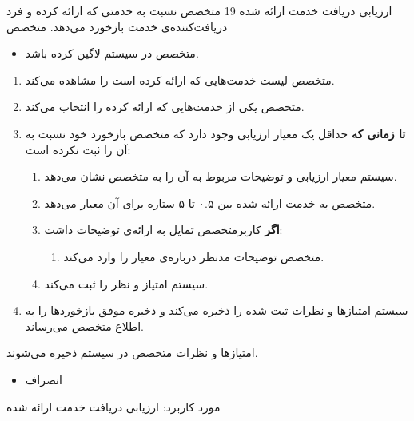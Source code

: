 \usecase
{
	ارزیابی دریافت خدمت ارائه شده
}
{19}
{
	متخصص نسبت به خدمتی که ارائه کرده و فرد دریافت‌کننده‌ی خدمت بازخورد می‌دهد.
}
{
	متخصص
}
{}
{
	\begin{itemize}
		\vspace*{-0.6cm}
		\item 
		متخصص در سیستم لاگین کرده باشد.
	\end{itemize}
}
{
	\vspace*{-0.6cm}
	\begin{enumerate}
		\item 
		متخصص لیست خدمت‌هایی که ارائه کرده است را مشاهده می‌کند.
		\item
		متخصص یکی از خدمت‌هایی که ارائه کرده را انتخاب می‌کند.
		\item
		\textbf{تا زمانی که} حداقل یک معیار ارزیابی وجود دارد که متخصص بازخورد خود نسبت به آن را ثبت نکرده است:
		
		\begin{enumerate}[label=\theenumi.\arabic*.]
			\item
			سیستم معیار ارزیابی و توضیحات مربوط به آن را به متخصص نشان می‌دهد.
			\item 
			متخصص به خدمت ارائه شده بین ۰.۵ تا ۵ ستاره برای آن معیار می‌دهد.
			\item 
			\textbf{اگر} کاربرمتخصص تمایل به ارائه‌ی توضیحات داشت:
			\begin{enumerate}
				\item 
				متخصص توضیحات مدنظر درباره‌ی معیار را وارد می‌کند. 
			\end{enumerate}
			\item 
			سیستم امتیاز و نظر را ثبت می‌کند.
		\end{enumerate}
		\item
		سیستم امتیازها و نظرات ثبت شده را ذخیره می‌کند و ذخیره موفق بازخوردها را به اطلاع متخصص می‌رساند.
		
	\end{enumerate}
}
{
	امتیازها و نظرات متخصص در سیستم ذخیره می‌شوند.
}
{
	\begin{itemize}
		\vspace*{-0.6cm}
		\item 
		انصراف
	\end{itemize}
}
{
	مورد کاربرد: ارزیابی دریافت خدمت ارائه شده
}




